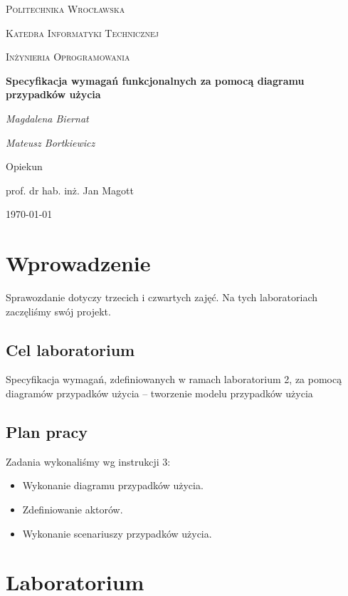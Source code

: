 \documentclass{article}
\begin{document}
	
	\begin{titlepage}
		\centering
		{\scshape\LARGE Politechnika Wrocławska \par}
		{\scshape\Large Katedra Informatyki Technicznej\par}
		
		\vspace{1cm}
		{\scshape\Large Inżynieria Oprogramowania\par}
		\vspace{1.5cm}
		{\huge\bfseries Specyfikacja wymagań funkcjonalnych za pomocą diagramu przypadków użycia\par}
		\vspace{2cm}
		{\Large\itshape Magdalena Biernat\par}
		{\Large\itshape Mateusz Bortkiewicz\par}
		\vfill
		Opiekun\par
		prof. dr hab. inż. Jan Magott 
		
		\vfill
		{\large \today\par}
	\end{titlepage}
	\newpage
	
	\section{Wprowadzenie}
	Sprawozdanie dotyczy trzecich i czwartych zajęć. Na tych laboratoriach zaczęliśmy swój projekt. 
	
	\subsection{Cel laboratorium}
Specyfikacja wymagań, zdefiniowanych w ramach laboratorium 2, za pomocą diagramów przypadków użycia – tworzenie modelu
przypadków użycia 
	
	\subsection{Plan pracy}
	Zadania wykonaliśmy wg instrukcji 3:

	\begin{itemize}
		\item Wykonanie diagramu przypadków użycia.
		\item Zdefiniowanie aktorów.
		\item Wykonanie scenariuszy przypadków użycia.
	\end{itemize}

	\section{Laboratorium}
\end{document}
